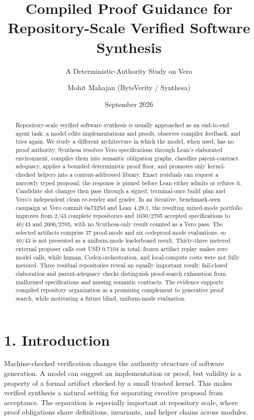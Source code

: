 \documentclass[
  10pt,
]{article}
\title{Compiled Proof Guidance for Repository-Scale Verified Software
Synthesis}
\subtitle{A Deterministic-Authority Study on Vero}
\author{Mohit Mahajan (ByteVerity / Synthesa)}
\date{September 2026}
\begin{document}
\maketitle
\begin{abstract}
Repository-scale verified software synthesis is usually approached as an
end-to-end agent task: a model edits implementations and proofs,
observes compiler feedback, and tries again. We study a different
architecture in which the model, when used, has no proof authority.
Synthesa resolves Vero specifications through Lean's elaborated
environment, compiles them into semantic obligation graphs, classifies
parent-contract adequacy, applies a bounded deterministic proof floor,
and promotes only kernel-checked helpers into a content-addressed
library. Exact residuals can request a narrowly typed proposal; the
response is pinned before Lean either admits or refutes it. Candidate
slot changes then pass through a signed, terminal-once build plan and
Vero's independent clean re-render and grader. In an iterative,
benchmark-seen campaign at Vero commit 0a7325d and Lean 4.29.1, the
resulting mixed-mode portfolio improves from 2/43 complete repositories
and 1030/2705 accepted specifications to 40/43 and 2606/2705, with no
Synthesa-only result counted as a Vero pass. The selected artifacts
comprise 37 proof-mode and six codeproof-mode evaluations, so 40/43 is
not presented as a uniform-mode leaderboard result. Thirty-three metered
external proposer calls cost USD 0.7104 in total; frozen artifact replay
makes zero model calls, while human, Codex-orchestration, and
local-compute costs were not fully metered. Three residual repositories
reveal an equally important result: fail-closed elaboration and
parent-adequacy checks distinguish proof-search exhaustion from
malformed specifications and missing semantic contracts. The evidence
supports compiled repository organization as a promising complement to
generative proof search, while motivating a future blind, uniform-mode
evaluation.
\end{abstract}

{
\setcounter{tocdepth}{3}
\tableofcontents
}
\section{1. Introduction}\label{introduction}

Machine-checked verification changes the authority structure of software
generation. A model can suggest an implementation or proof, but validity
is a property of a formal artifact checked by a small trusted kernel.
This makes verified synthesis a natural setting for separating creative
proposal from acceptance. The separation is especially important at
repository scale, where proof obligations share definitions, invariants,
and helper chains across modules.
\end{document}

